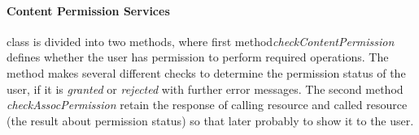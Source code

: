 \paragraph{Content Permission Services} class is divided into two methods, where first method\textit{checkContentPermission} defines whether the user has permission to perform required operations. The method makes several different checks to determine the permission status of the user, if it is \textit{granted} or \textit{rejected} with further error messages.  The second method \textit{checkAssocPermission} retain the response of calling resource and called resource (the result about permission status) so that later probably to show it to the user.  